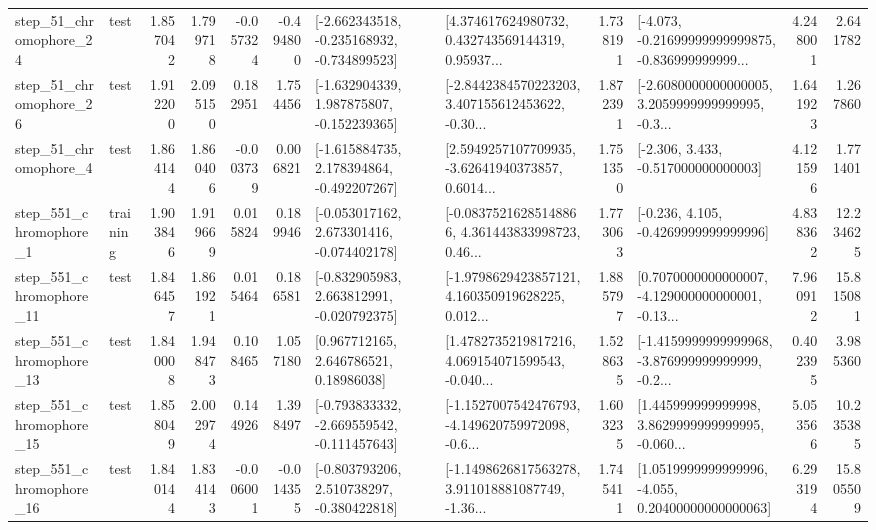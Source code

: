 \begin{tabular}{llrrrrllrlrr}
   step\_51\_chromophore\_24 &      test &      1.857042 &    1.799718 &     -0.057324 & -0.494800 &  [-2.662343518, -0.235168932, -0.734899523] &  [4.374617624980732, 0.432743569144319, 0.95937... &       1.738191 &  [-4.073, -0.21699999999999875, -0.836999999999... &            4.248001 &          2.641782 \\
   step\_51\_chromophore\_26 &      test &      1.912200 &    2.095150 &      0.182951 &  1.754456 &   [-1.632904339, 1.987875807, -0.152239365] &  [-2.8442384570223203, 3.407155612453622, -0.30... &       1.872391 &  [-2.6080000000000005, 3.2059999999999995, -0.3... &            1.641923 &          1.267860 \\
    step\_51\_chromophore\_4 &      test &      1.864144 &    1.860406 &     -0.003739 &  0.006821 &   [-1.615884735, 2.178394864, -0.492207267] &  [2.5949257107709935, -3.62641940373857, 0.6014... &       1.751350 &                [-2.306, 3.433, -0.517000000000003] &            4.121596 &          1.771401 \\
   step\_551\_chromophore\_1 &  training &      1.903846 &    1.919669 &      0.015824 &  0.189946 &   [-0.053017162, 2.673301416, -0.074402178] &  [-0.08375216285148866, 4.361443833998723, 0.46... &       1.773063 &               [-0.236, 4.105, -0.4269999999999996] &            4.838362 &         12.234625 \\
  step\_551\_chromophore\_11 &      test &      1.846457 &    1.861921 &      0.015464 &  0.186581 &   [-0.832905983, 2.663812991, -0.020792375] &  [-1.9798629423857121, 4.160350919628225, 0.012... &       1.885797 &  [0.7070000000000007, -4.129000000000001, -0.13... &            7.960912 &         15.815081 \\
  step\_551\_chromophore\_13 &      test &      1.840008 &    1.948473 &      0.108465 &  1.057180 &      [0.967712165, 2.646786521, 0.18986038] &  [1.4782735219817216, 4.069154071599543, -0.040... &       1.528635 &  [-1.4159999999999968, -3.876999999999999, -0.2... &            0.402395 &          3.985360 \\
  step\_551\_chromophore\_15 &      test &      1.858049 &    2.002974 &      0.144926 &  1.398497 &  [-0.793833332, -2.669559542, -0.111457643] &  [-1.1527007542476793, -4.149620759972098, -0.6... &       1.603235 &  [1.445999999999998, 3.8629999999999995, -0.060... &            5.053566 &         10.235385 \\
  step\_551\_chromophore\_16 &      test &      1.840144 &    1.834143 &     -0.006001 & -0.014355 &   [-0.803793206, 2.510738297, -0.380422818] &  [-1.1498626817563278, 3.911018881087749, -1.36... &       1.745411 &  [1.0519999999999996, -4.055, 0.20400000000000063] &            6.293194 &         15.805509 \\

\end{tabular}
